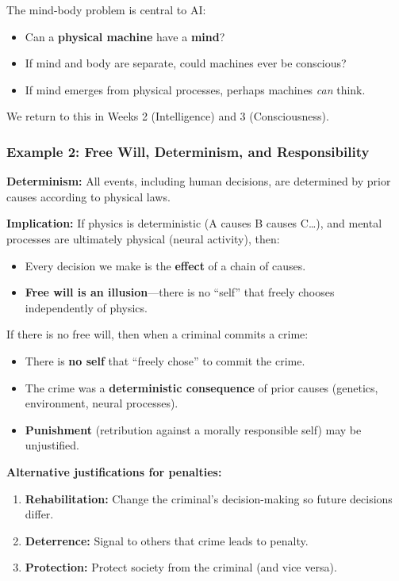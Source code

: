 \begin{tipbox}[Relevance to AI]
The mind-body problem is central to AI:
\begin{itemize}
  \item Can a \textbf{physical machine} have a \textbf{mind}?
  \item If mind and body are separate, could machines ever be conscious?
  \item If mind emerges from physical processes, perhaps machines \textit{can} think.
\end{itemize}
We return to this in Weeks 2 (Intelligence) and 3 (Consciousness).
\end{tipbox}

\bigseparator

\subsubsection{Example 2: Free Will, Determinism, and Responsibility}

\begin{defbox}[Determinism]
\textbf{Determinism:} All events, including human decisions, are determined by prior causes according to physical laws.

\textbf{Implication:} If physics is deterministic (A causes B causes C\ldots), and mental processes are ultimately physical (neural activity), then:
\begin{itemize}
  \item Every decision we make is the \textbf{effect} of a chain of causes.
  \item \textbf{Free will is an illusion}---there is no ``self'' that freely chooses independently of physics.
\end{itemize}
\end{defbox}

\begin{thmbox}
If there is no free will, then when a criminal commits a crime:
\begin{itemize}
  \item There is \textbf{no self} that ``freely chose'' to commit the crime.
  \item The crime was a \textbf{deterministic consequence} of prior causes (genetics, environment, neural processes).
  \item \textbf{Punishment} (retribution against a morally responsible self) may be unjustified.
\end{itemize}

\textbf{Alternative justifications for penalties:}
\begin{enumerate}
  \item \textbf{Rehabilitation:} Change the criminal's decision-making so future decisions differ.
  \item \textbf{Deterrence:} Signal to others that crime leads to penalty.
  \item \textbf{Protection:} Protect society from the criminal (and vice versa).
\end{enumerate}
\end{thmbox}

